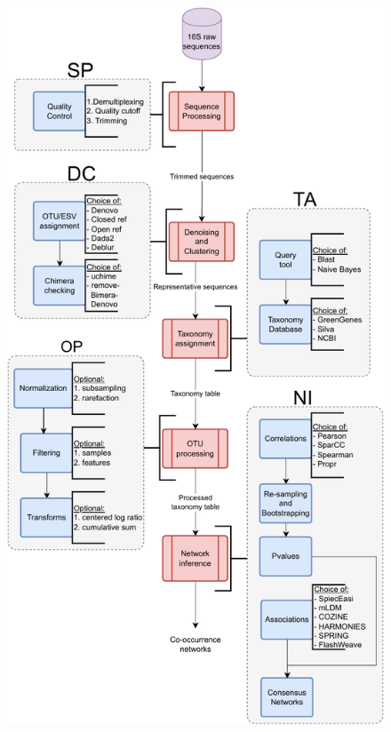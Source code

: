 \documentclass[letterpaper,12pt]{article}
\providecommand{\DIFdelbegin}{} %
\providecommand{\DIFaddbeginFL}{} %
\providecommand{\DIFaddendFL}{} %
\providecommand{\DIFdelbeginFL}{} %
\providecommand{\DIFdelendFL}{} %
\newcommand{\DIFscaledelfig}{0.5}
\newlength{\DIFdelgraphicswidth} %
\newlength{\DIFdelgraphicsheight} %
\newcommand{\DIFaddincludegraphics}[2][]{{\color{blue}\fbox{\DIFOincludegraphics[#1]{#2}}}} %
\newcommand{\DIFdelincludegraphics}[2][]{%
\sbox{\DIFdelgraphicsbox}{\DIFOincludegraphics[#1]{#2}}%
\settoboxwidth{\DIFdelgraphicswidth}{\DIFdelgraphicsbox} %
\settoboxtotalheight{\DIFdelgraphicsheight}{\DIFdelgraphicsbox} %
\scalebox{\DIFscaledelfig}{%
\parbox[b]{\DIFdelgraphicswidth}{\usebox{\DIFdelgraphicsbox}\\[-\baselineskip] \rule{\DIFdelgraphicswidth}{0em}}\llap{\resizebox{\DIFdelgraphicswidth}{\DIFdelgraphicsheight}{%
\setlength{\unitlength}{\DIFdelgraphicswidth}%
\begin{picture}(1,1)%
\thicklines\linethickness{2pt} %
{\color[rgb]{1,0,0}\put(0,0){\framebox(1,1){}}}%
{\color[rgb]{1,0,0}\put(0,0){\line( 1,1){1}}}%
{\color[rgb]{1,0,0}\put(0,1){\line(1,-1){1}}}%
\end{picture}%
}\hspace*{3pt}}} %
} %
\DeclareRobustCommand{\DIFdelbegin}{\DIFOdelbegin \let\includegraphics\DIFdelincludegraphics} %
\DeclareRobustCommand{\DIFaddbeginFL}{\DIFOaddbeginFL \let\includegraphics\DIFaddincludegraphics} %
\DeclareRobustCommand{\DIFaddendFL}{\DIFOaddendFL \let\includegraphics\DIFOincludegraphics} %
\DeclareRobustCommand{\DIFdelbeginFL}{\DIFOdelbeginFL \let\includegraphics\DIFdelincludegraphics} %
\DeclareRobustCommand{\DIFdelendFL}{\DIFOaddendFL \let\includegraphics\DIFOincludegraphics} %
\begin{document}
  \DIFdelbegin %
\DIFdelendFL \DIFaddbeginFL \begin{figure}[H]
    \DIFaddendFL \centering
    \DIFdelbeginFL %
\DIFdelendFL \DIFaddbeginFL \includegraphics[width=0.74\linewidth]{figure1.pdf}
  \end{figure}
\end{document}
